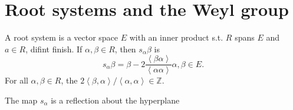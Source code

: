 
\section*{Root systems and the Weyl group}

\begin{definition}\label{dfn:?}
	A root system is a vector space $E$ with an inner product s.t. $R$ spans $E$ and $a\in R$, difint finish. If $\alpha ,\beta \in R$, then $s_\alpha \beta$ is
	\[
		s_\alpha \beta =\beta -2\frac{\left\langle \beta \alpha  \right\rangle }{\left\langle \alpha \alpha  \right\rangle } \alpha ,\beta \in E
	.\]
	For all $\alpha ,\beta \in R$, the $2\left\langle \beta ,\alpha  \right\rangle /\left\langle \alpha ,\alpha  \right\rangle \in\mathbb{Z} $.
\end{definition}

The map $s_\alpha $ is a reflection about the hyperplane
